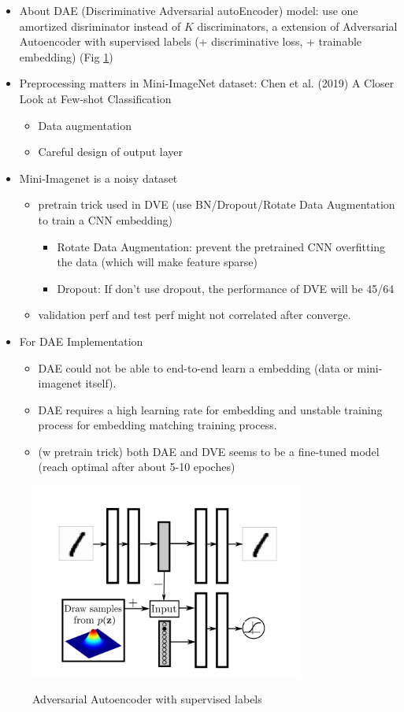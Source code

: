 \documentclass{article}
\begin{document}
\begin{itemize}
    \item About DAE (Discriminative Adversarial autoEncoder) model: use one amortized disriminator instead of $K$ discriminators, a extension of Adversarial Autoencoder with supervised labels (+ discriminative loss, + trainable embedding) (Fig \ref{ae})
    \item Preprocessing matters in Mini-ImageNet dataset: Chen et al. (2019) A Closer Look at Few-shot Classification
        \begin{itemize}
            \item Data augmentation
            \item Careful design of output layer
        \end{itemize}
    \item Mini-Imagenet is a noisy dataset
        \begin{itemize}
            \item pretrain trick used in DVE (use BN/Dropout/Rotate Data Augmentation to train a CNN embedding)
                \begin{itemize}
                    \item Rotate Data Augmentation: prevent the pretrained CNN overfitting the data (which will make feature sparse)
                    \item Dropout: If don't use dropout, the performance of DVE will be 45/64
                \end{itemize}
            \item validation perf and test perf might not correlated after converge.
        \end{itemize}
    \item For DAE Implementation
        \begin{itemize}
            \item DAE could not be able to end-to-end learn a embedding (data or mini-imagenet itself).
            \item DAE requires a high learning rate for embedding and unstable training process for embedding matching training process.
            \item (w pretrain trick) both DAE and DVE seems to be a fine-tuned model (reach optimal after about 5-10 epoches)
        \end{itemize}
\end{itemize}

\begin{figure}
\centering
\includegraphics[width=0.8\textwidth]{ae_s.png}
\label{ae}
\caption{Adversarial Autoencoder with supervised labels}
\end{figure}
\end{document}
